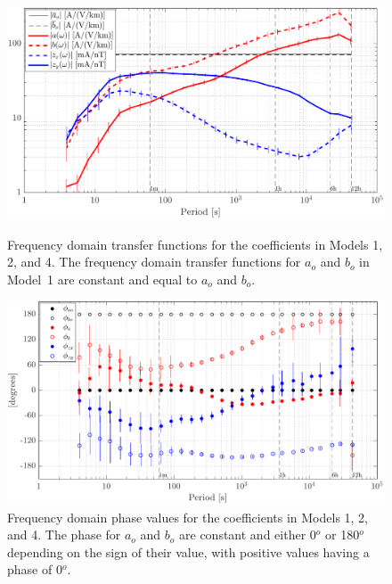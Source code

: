 \documentclass[draft,linenumbers]{agujournal2018}
\begin{document}
\begin{figure}[h]
\centering
\includegraphics[width=\textwidth]{figures/plot_model_summary_Z-options-1.pdf}
\caption{Frequency domain transfer functions for the coefficients in Models 1, 2, and 4. The frequency domain transfer functions for $a_o$ and $b_o$ in Model~1 are constant and equal to $a_o$ and $b_o$.}
\label{Z}

\vspace{4em}

\centering
\includegraphics[width=\textwidth]{figures/plot_model_summary_Phi-options-1.pdf}
\caption{Frequency domain phase values for the coefficients in Models 1, 2, and 4. The phase for $a_o$ and $b_o$ are constant and either 0$^o$ or 180$^o$ depending on the sign of their value, with positive values having a phase of 0$^o$.}
\label{Phi}
\end{figure}
\end{document}
